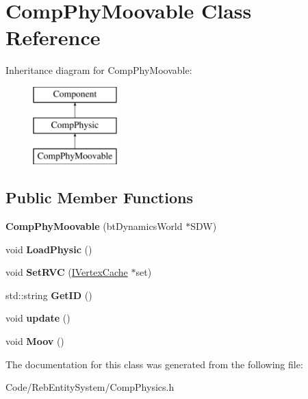 \hypertarget{class_comp_phy_moovable}{}\section{Comp\+Phy\+Moovable Class Reference}
\label{class_comp_phy_moovable}
Inheritance diagram for Comp\+Phy\+Moovable\+:\begin{figure}[H]
\begin{center}
\leavevmode
\includegraphics[height=3.000000cm]{class_comp_phy_moovable}
\end{center}
\end{figure}
\subsection*{Public Member Functions}
\begin{DoxyCompactItemize}
\item 
{\bfseries Comp\+Phy\+Moovable} (bt\+Dynamics\+World $\ast$S\+DW)\hypertarget{class_comp_phy_moovable_a9ce47ac288f79aa9901f12166d46574a}{}\label{class_comp_phy_moovable_a9ce47ac288f79aa9901f12166d46574a}

\item 
void {\bfseries Load\+Physic} ()\hypertarget{class_comp_phy_moovable_af1f3236601aa1477b0c06b2fcf49acea}{}\label{class_comp_phy_moovable_af1f3236601aa1477b0c06b2fcf49acea}

\item 
void {\bfseries Set\+R\+VC} (\hyperlink{class_i_vertex_cache}{I\+Vertex\+Cache} $\ast$set)\hypertarget{class_comp_phy_moovable_a5c2635e5f3db3784594c940888bbf741}{}\label{class_comp_phy_moovable_a5c2635e5f3db3784594c940888bbf741}

\item 
std\+::string {\bfseries Get\+ID} ()\hypertarget{class_comp_phy_moovable_a6f6cc50a1e0775c456774fdd9fcf05fc}{}\label{class_comp_phy_moovable_a6f6cc50a1e0775c456774fdd9fcf05fc}

\item 
void {\bfseries update} ()\hypertarget{class_comp_phy_moovable_a595f0cd905cd8bbae94564169e246f5c}{}\label{class_comp_phy_moovable_a595f0cd905cd8bbae94564169e246f5c}

\item 
void {\bfseries Moov} ()\hypertarget{class_comp_phy_moovable_a2b45c9d5000a2c7dbc9890f5f44144b8}{}\label{class_comp_phy_moovable_a2b45c9d5000a2c7dbc9890f5f44144b8}

\end{DoxyCompactItemize}


The documentation for this class was generated from the following file\+:\begin{DoxyCompactItemize}
\item 
Code/\+Reb\+Entity\+System/Comp\+Physics.\+h\end{DoxyCompactItemize}
